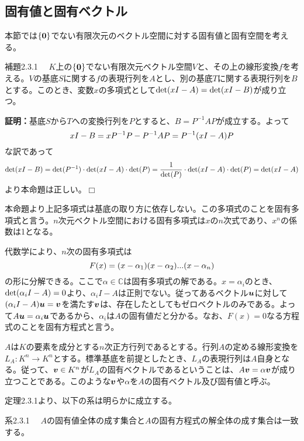 \documentclass[dvipdfmx, 9pt, a4paper]{jsarticle}
\numberwithin{equation}{subsection}
\newcommand{\bm}[1]{{\mbox{\boldmath $#1$}}}
\def\qed{\hfill $\Box$}
\begin{document}
\subsection{固有値と固有ベクトル}
本節では$\{ \bm 0\}$でない有限次元のベクトル空間に対する固有値と固有空間を考える。
\begin{itembox}[l]{補題2.3.1}
　$K$上の$\{\bm 0\}$でない有限次元ベクトル空間$V$と、その上の線形変換$f$を考える。$V$の基底$S$に関する$f$の表現行列を$A$とし、別の基底$T$に関する表現行列を$B$とする。このとき、変数$x$の多項式として${\rm det}(xI-A)={\rm det}(xI-B)$が成り立つ。
\end{itembox}
{\bf 証明：}基底$S$から$T$への変換行列を$P$とすると、$B=P^{-1}AP$が成立する。よって
\begin{equation}
xI-B=xP^{-1}P-P^{-1}AP=P^{-1}(xI-A)P \notag
\end{equation}
な訳であって
\begin{equation}
{\rm det}(xI-B)={\rm det}(P^{-1})\cdot {\rm det}(xI-A) \cdot {\rm det}(P)=\frac{1}{{\rm det}(P)}\cdot {\rm det}(xI-A) \cdot {\rm det}(P)={\rm det}(xI-A) \notag
\end{equation}
より本命題は正しい。\qed \par
本命題より上記多項式は基底の取り方に依存しない。この多項式のことを固有多項式と言う。$n$次元ベクトル空間における固有多項式は$x$の$n$次式であり、$x^n$の係数は1となる。\par
代数学により、$n$次の固有多項式は
\begin{equation}
F(x)=(x-\alpha_1)(x-\alpha_2)...(x-\alpha_n) \notag
\end{equation}
の形に分解できる。ここで$\alpha \in \mathbb{C}$は固有多項式の解である。$x=\alpha_i$のとき、${\rm det}(\alpha_iI-A)=0$より、$\alpha_iI-A$は正則でない。従ってあるベクトル$\bm u$に対して$(\alpha_iI-A)\bm u=\bm v$を満たす$\bm v$は、存在したとしてもゼロベクトルのみである。よって$A\bm u=\alpha_i \bm u$であるから、$\alpha_i$は$A$の固有値だと分かる。なお、$F(x)=0$なる方程式のことを固有方程式と言う。\par
$A$は$K$の要素を成分とする$n$次正方行列であるとする。行列$A$の定める線形変換を$L_A:K^n \to K^n$とする。標準基底を前提としたとき、$L_A$の表現行列は$A$自身となる。従って、$\bm v \in K^n$が$L_A$の固有ベクトルであるということは、$A\bm v=\alpha \bm v$が成り立つことである。このような$\bm v$や$\alpha$を$A$の固有ベクトル及び固有値と呼ぶ。\par
定理2.3.1より、以下の系は明らかに成立する。
\begin{itembox}[l]{系2.3.1}
　$A$の固有値全体の成す集合と$A$の固有方程式の解全体の成す集合は一致する。
\end{itembox}
\end{document}

